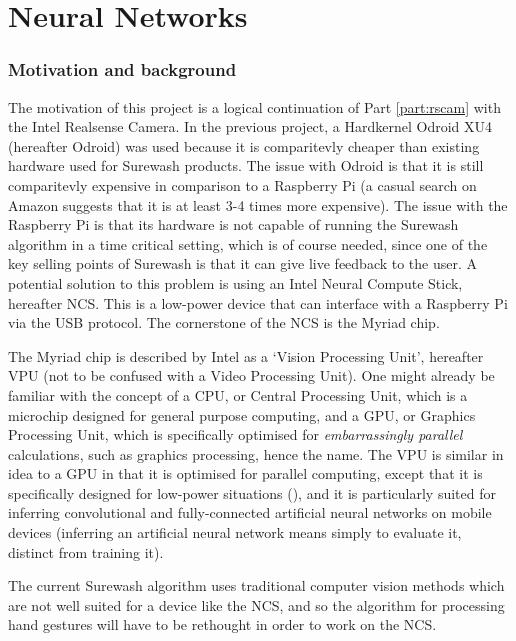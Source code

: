 \part{Neural Networks}
\section{Motivation and background}
The motivation of this project is a logical continuation of Part \ref{part:rscam} with the Intel Realsense Camera. In the previous project, a Hardkernel Odroid XU4 (hereafter Odroid) was used because it is comparitevly cheaper than existing hardware used for Surewash products. The issue with Odroid is that it is still comparitevly expensive in comparison to a Raspberry Pi (a casual search on Amazon suggests that it is at least 3-4 times more expensive). The issue with the Raspberry Pi is that its hardware is not capable of running the Surewash algorithm in a time critical setting, which is of course needed, since one of the key selling points of Surewash is that it can give live feedback to the user. A potential solution to this problem is using an Intel Neural Compute Stick, hereafter NCS. This is a low-power device that can interface with a Raspberry Pi via the USB protocol. The cornerstone of the NCS is the Myriad chip.

The Myriad chip is described by Intel as a `Vision Processing Unit', hereafter VPU (not to be confused with a Video Processing Unit). One might already be familiar with the concept of a CPU, or Central Processing Unit, which is a microchip designed for general purpose computing, and a GPU, or Graphics Processing Unit, which is specifically optimised for {\slshape embarrassingly parallel} calculations, such as graphics processing, hence the name. The VPU is similar in idea to a GPU in that it is optimised for parallel computing, except that it is specifically designed for low-power situations (\cite{7024073}), and it is particularly suited for inferring convolutional and fully-connected artificial neural networks on mobile devices (inferring an artificial neural network means simply to evaluate it, distinct from training it).

The current Surewash algorithm uses traditional computer vision methods which are not well suited for a device like the NCS, and so the algorithm for processing hand gestures will have to be rethought in order to work on the NCS.

